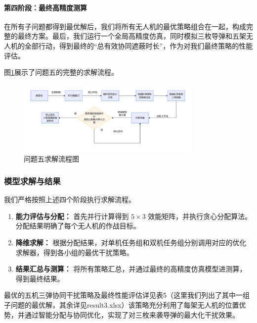 \documentclass[12pt]{article}
\begin{document}
\begin{CJK}{UTF8}{gbsn}
		\paragraph{第四阶段：最终高精度测算}
		在所有子问题都得到最优解后，我们将所有无人机的最优策略组合在一起，构成完整的最终方案。最后，我们运行一个全局高精度仿真，同时模拟三枚导弹和五架无人机的全部行动，得到最终的“总有效协同遮蔽时长”，作为对我们最终策略的性能评估。
		
		图\ref{fig:flowchart_q5}展示了问题五的完整的求解流程。
		
		\begin{figure}[H]
			\centering
			\includegraphics[width=0.8\textwidth]{pic/Pb5.jpg}
			\caption{问题五求解流程图}
			\label{fig:flowchart_q5}
		\end{figure}
		
		
		\subsubsection{模型求解与结果}
		我们严格按照上述四个阶段执行求解流程。
		\begin{enumerate}
			\item \textbf{能力评估与分配：} 首先并行计算得到 $5 \times 3$ 效能矩阵，并执行贪心分配算法。分配结果明确了每个无人机的作战目标。
			\item \textbf{降维求解：} 根据分配结果，对单机任务组和双机任务组分别调用对应的优化求解器，得到各小组的最优干扰策略。
			\item \textbf{结果汇总与测算：} 将所有策略汇总，并通过最终的高精度仿真模型进测算，得到最终结果。
		\end{enumerate}
		最优的五机三弹协同干扰策略及最终性能评估详见表5（这里我们列出了其中一组子问题的最优解，其余详见result3.xlsx）该策略充分利用了每架无人机的位置优势，并通过智能分配与协同优化，实现了对三枚来袭导弹的最大化干扰效果。
		

\end{CJK}
\end{document}
